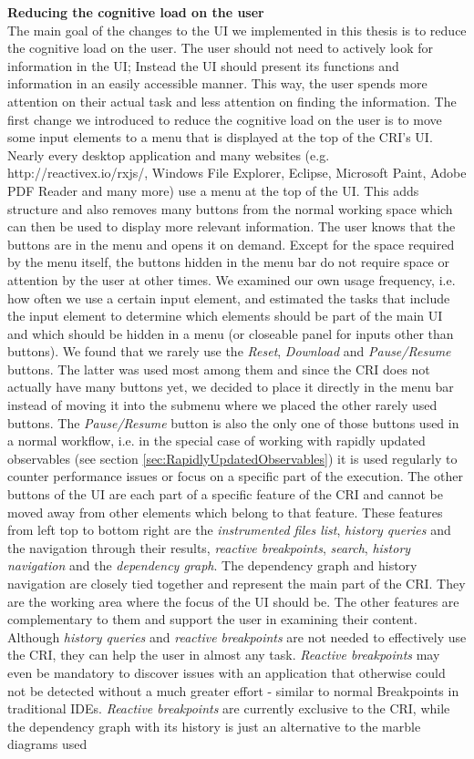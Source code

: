 \noindent\textbf{Reducing the cognitive load on the user}\\
The main goal of the changes to the UI we implemented in this thesis is to reduce the cognitive load on the user. The user should not need to actively look for information in the UI; Instead the UI should present its functions and information in an easily accessible manner. This way, the user spends more attention on their actual task and less attention on finding the information. The first change we introduced to reduce the cognitive load on the user is to move some input elements to a menu that is displayed at the top of the CRI's UI. Nearly every desktop application and many websites (e.g. http://reactivex.io/rxjs/, Windows File Explorer, Eclipse, Microsoft Paint, Adobe PDF Reader and many more) use a menu at the top of the UI. This adds structure and also removes many buttons from the normal working space which can then be used to display more relevant information. The user knows that the buttons are in the menu and opens it on demand. Except for the space required by the menu itself, the buttons hidden in the menu bar do not require space or attention by the user at other times. We examined our own usage frequency, i.e. how often we use a certain input element, and estimated the tasks that include the input element to determine which elements should be part of the main UI and which should be hidden in a menu (or closeable panel for inputs other than buttons). We found that we rarely use the \emph{Reset}, \emph{Download} and \emph{Pause/Resume} buttons. The latter was used most among them and since the CRI does not actually have many buttons yet, we decided to place it directly in the menu bar instead of moving it into the submenu where we placed the other rarely used buttons. The \emph{Pause/Resume} button is also the only one of those buttons used in a normal workflow, i.e. in the special case of working with rapidly updated observables (see section \ref{sec:RapidlyUpdatedObservables}) it is used regularly to counter performance issues or focus on a specific part of the execution. The other buttons of the UI are each part of a specific feature of the CRI and cannot be moved away from other elements which belong to that feature. These features from left top to bottom right are the \emph{instrumented files list}, \emph{history queries} and the navigation through their results, \emph{reactive breakpoints}, \emph{search}, \emph{history navigation} and the \emph{dependency graph}. The dependency graph and history navigation are closely tied together and represent the main part of the CRI. They are the working area where the focus of the UI should be. The other features are complementary to them and support the user in examining their content. Although \emph{history queries} and \emph{reactive breakpoints} are not needed to effectively use the CRI, they can help the user in almost any task. \emph{Reactive breakpoints} may even be mandatory to discover issues with an application that otherwise could not be detected without a much greater effort - similar to normal Breakpoints in traditional IDEs. \emph{Reactive breakpoints} are currently exclusive to the CRI, while the dependency graph with its history is just an alternative to the marble diagrams used 